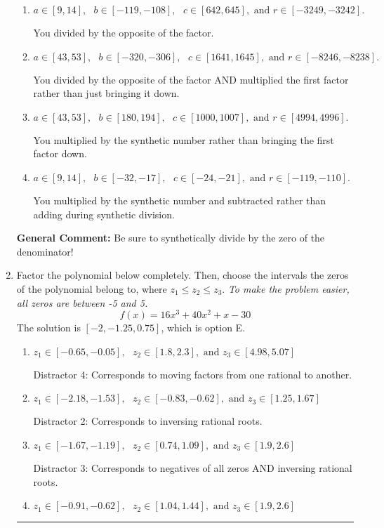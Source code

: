 \documentclass{extbook}[14pt]
\newcommand{\litem}[1]{\item #1

\rule{\textwidth}{0.4pt}}
\begin{document}
\begin{enumerate}
{\begin{enumerate}[label=\Alph*.]
* This is the solution!
\item \( a \in [9, 14], \text{   } b \in [-119, -108], \text{   } c \in [642, 645], \text{   and   } r \in [-3249, -3242]. \)

 You divided by the opposite of the factor.
\item \( a \in [43, 53], \text{   } b \in [-320, -306], \text{   } c \in [1641, 1645], \text{   and   } r \in [-8246, -8238]. \)

 You divided by the opposite of the factor AND multiplied the first factor rather than just bringing it down.
\item \( a \in [43, 53], \text{   } b \in [180, 194], \text{   } c \in [1000, 1007], \text{   and   } r \in [4994, 4996]. \)

 You multiplied by the synthetic number rather than bringing the first factor down.
\item \( a \in [9, 14], \text{   } b \in [-32, -17], \text{   } c \in [-24, -21], \text{   and   } r \in [-119, -110]. \)

 You multiplied by the synthetic number and subtracted rather than adding during synthetic division.
\end{enumerate}

\textbf{General Comment:} Be sure to synthetically divide by the zero of the denominator!
}
\litem{
Factor the polynomial below completely. Then, choose the intervals the zeros of the polynomial belong to, where $z_1 \leq z_2 \leq z_3$. \textit{To make the problem easier, all zeros are between -5 and 5.}
\[ f(x) = 16x^{3} +40 x^{2} +x -30 \]The solution is \( [-2, -1.25, 0.75] \), which is option E.\begin{enumerate}[label=\Alph*.]
\item \( z_1 \in [-0.65, -0.05], \text{   }  z_2 \in [1.8, 2.3], \text{   and   } z_3 \in [4.98, 5.07] \)

 Distractor 4: Corresponds to moving factors from one rational to another.
\item \( z_1 \in [-2.18, -1.53], \text{   }  z_2 \in [-0.83, -0.62], \text{   and   } z_3 \in [1.25, 1.67] \)

 Distractor 2: Corresponds to inversing rational roots.
\item \( z_1 \in [-1.67, -1.19], \text{   }  z_2 \in [0.74, 1.09], \text{   and   } z_3 \in [1.9, 2.6] \)

 Distractor 3: Corresponds to negatives of all zeros AND inversing rational roots.
\item \( z_1 \in [-0.91, -0.62], \text{   }  z_2 \in [1.04, 1.44], \text{   and   } z_3 \in [1.9, 2.6] \)


\end{enumerate}}
\end{enumerate}
\end{document}
